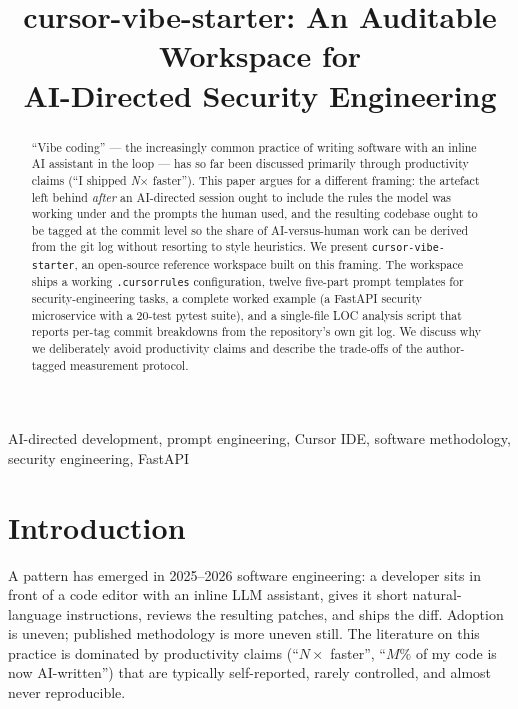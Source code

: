 \documentclass[conference]{IEEEtran}
\title{cursor-vibe-starter: An Auditable Workspace for\\AI-Directed Security Engineering}
\author{
\IEEEauthorblockN{Ali Murtaza Bhutto}
\IEEEauthorblockA{Independent Researcher\\
ORCID: 0009-0007-2787-943X\\
\href{https://github.com/thunderstornX/cursor-vibe-starter}{github.com/thunderstornX/cursor-vibe-starter}}
}
\begin{document}
\maketitle

\begin{abstract}
``Vibe coding'' --- the increasingly common practice of writing
software with an inline AI assistant in the loop --- has so far been
discussed primarily through productivity claims (``I shipped
\emph{N$\times$} faster''). This paper argues for a different framing:
the artefact left behind \emph{after} an AI-directed session ought to
include the rules the model was working under and the prompts the
human used, and the resulting codebase ought to be tagged at the
commit level so the share of AI-versus-human work can be derived
from the git log without resorting to style heuristics.
We present \texttt{cursor-vibe-starter}, an open-source reference
workspace built on this framing. The workspace ships a working
\texttt{.cursorrules} configuration, twelve five-part prompt
templates for security-engineering tasks, a complete worked example
(a FastAPI security microservice with a 20-test pytest suite), and a
single-file LOC analysis script that reports per-tag commit breakdowns
from the repository's own git log. We discuss why we deliberately
avoid productivity claims and describe the trade-offs of the
author-tagged measurement protocol.
\end{abstract}

\begin{IEEEkeywords}
AI-directed development, prompt engineering, Cursor IDE, software
methodology, security engineering, FastAPI
\end{IEEEkeywords}

\section{Introduction}
\label{sec:intro}

A pattern has emerged in 2025--2026 software engineering: a developer
sits in front of a code editor with an inline LLM assistant, gives it
short natural-language instructions, reviews the resulting patches,
and ships the diff. Adoption is uneven; published methodology is more
uneven still. The literature on this practice is dominated by
productivity claims (``$N\times$ faster'', ``$M\%$ of my code is now
AI-written'') that are typically self-reported, rarely controlled,
and almost never reproducible.
\end{document}
